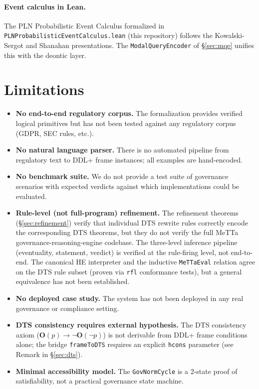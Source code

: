 \documentclass[]{article}
\newcommand{\code}[1]{\texttt{#1}}
\newcommand{\OB}{\ensuremath{\mathbf{O}}}
\newcommand{\DDL}{\textup{DDL+}}
\newcommand{\DTS}{\textup{DTS}}
\newcommand{\PLN}{\textup{PLN}}
\begin{document}
\paragraph{Event calculus in Lean.}
The \PLN{} Probabilistic Event Calculus formalized in
\code{PLNProbabilisticEventCalculus.lean} (this repository) follows the
Kowalski-Sergot \cite{KowalskiSergot1986} and Shanahan \cite{Shanahan1999}
presentations.  The \code{ModalQueryEncoder} of §\ref{sec:mqe} unifies this
with the deontic layer.

\section{Limitations}
\label{sec:limitations}

\begin{itemize}
\item \textbf{No end-to-end regulatory corpus.}
      The formalization provides verified logical primitives but has not been
      tested against any regulatory corpus (GDPR, SEC rules, etc.).
\item \textbf{No natural language parser.}
      There is no automated pipeline from regulatory text to \DDL{} frame
      instances; all examples are hand-encoded.
\item \textbf{No benchmark suite.}
      We do not provide a test suite of governance scenarios with expected
      verdicts against which implementations could be evaluated.
\item \textbf{Rule-level (not full-program) refinement.}
      The refinement theorems (\S\ref{sec:refinement}) verify that individual
      DTS rewrite rules correctly encode the corresponding \DTS{} theorems,
      but they do not verify the full MeTTa governance-reasoning-engine
      codebase.  The three-level inference pipeline (eventuality, statement,
      verdict) is verified at the rule-firing level, not end-to-end.
      The canonical HE interpreter and the inductive \code{MeTTaEval}
      relation agree on the DTS rule subset (proven via \code{rfl}
      conformance tests), but a general equivalence has not been established.
\item \textbf{No deployed case study.}
      The system has not been deployed in any real governance or compliance
      setting.
\item \textbf{DTS consistency requires external hypothesis.}
      The \DTS{} consistency axiom ($\OB(p) \to \neg\OB(\neg p)$) is not
      derivable from \DDL{} frame conditions alone; the bridge
      \code{frameToDTS} requires an explicit \code{hcons} parameter
      (see Remark in §\ref{sec:dts}).
\item \textbf{Minimal accessibility model.}
      The \code{GovNormCycle} is a 2-state proof of satisfiability, not a
      practical governance state machine.
\end{itemize}
\end{document}
